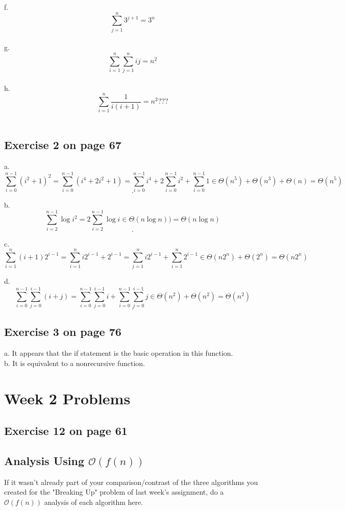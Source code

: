 \documentclass[12pt]{amsart}
\begin{document}
f.
 \[ \sum_{j=1}^{n} 3^{j+1} = 3^n \]\\

g.
 \[ \sum_{i=1}^{n} \sum_{j=1}^{n}ij = n^2 \]\\

h.
 \[ \sum_{i=1}^{n} \frac{1}{i(i+1)} = n^2 ??? \]\\

\subsection{Exercise 2 on page 67} $ $\\ 


a.
\[ \sum_{i = 0}^{n - 1} (i^2 + 1)^2 = \sum_{i = 0}^{n - 1}(i^4 + 2i^2 + 1) = \sum_{i = 0}^{n - 1} i^4 + 2 \sum_{i = 0}^{n - 1} i^2 + \sum_{i = 0}^{n - 1} 1 \in \Theta(n^5) + \Theta(n^3) + \Theta(n) = \Theta(n^5)
\]
\[.
\]

b.
\[ \sum_{i = 2}^{n - 1}\log{i^2} = 2 \sum_{i = 2}^{n - 1} \log{i} \in \Theta(n \log{n})) = \Theta(n \log{n})
\]
\[.
\]

c.
\[ \sum_{i = 1}^{n} (i + 1)2^{i-1} = \sum_{i = 1}^{n} i2^{i-1} + 2^{i-1} =  \sum_{i = 1}^{n}  i2^{i-1} + \sum_{i = 1}^{n} 2^{i-1}  \in \Theta(n2^n) + \Theta(2^n) = \Theta(n2^n)
\]
\[.
\]

d.
\[ \sum_{i = 0}^{n - 1} \sum_{j = 0}^{i - 1}  (i+j) = \sum_{i = 0}^{n - 1} \sum_{j = 0}^{i - 1}i + \sum_{i = 0}^{n - 1}  \sum_{j = 0}^{i - 1}j \in \Theta(n^2) + \Theta(n^2) = \Theta(n^2)
\]
\[.
\]

\subsection{Exercise 3 on page 76} $  $\\

a. It appears that the if statement is the basic operation in this function.  \\
b. It is equivalent to a nonrecursive function.\\
   
\section{Week 2 Problems}

\subsection{Exercise 12 on page 61}

\subsection{Analysis Using $\mathcal{O}(f(n))$}
   If it wasn't already part of your comparison/contrast of the three algorithms
  you created for the "Breaking Up" problem of last week's assignment, do a
  $\mathcal{O}(f(n))$ analysis of each algorithm here.
\end{document}
